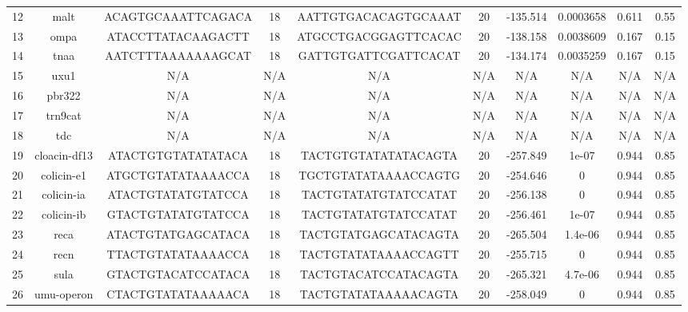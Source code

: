 \documentclass{article}
\begin{document}
\begin{table}
{\begin{tabular}{c|c|c|c|c|c|c|c|c|c}
 12 &          malt &  ACAGTGCAAATTCAGACA &    18 &  AATTGTGACACAGTGCAAAT &         20 &  -135.514 &  0.0003658 &    0.611 &   0.55 \\
 13 &          ompa &  ATACCTTATACAAGACTT &    18 &  ATGCCTGACGGAGTTCACAC &         20 &  -138.158 &  0.0038609 &    0.167 &   0.15 \\
 14 &          tnaa &  AATCTTTAAAAAAAGCAT &    18 &  GATTGTGATTCGATTCACAT &         20 &  -134.174 &  0.0035259 &    0.167 &   0.15 \\
 15 &          uxu1 &                 N/A &   N/A &                   N/A &        N/A &       N/A &        N/A &      N/A &    N/A \\
 16 &        pbr322 &                 N/A &   N/A &                   N/A &        N/A &       N/A &        N/A &      N/A &    N/A \\
 17 &       trn9cat &                 N/A &   N/A &                   N/A &        N/A &       N/A &        N/A &      N/A &    N/A \\
 18 &           tdc &                 N/A &   N/A &                   N/A &        N/A &       N/A &        N/A &      N/A &    N/A \\
 19 &  cloacin-df13 &  ATACTGTGTATATATACA &    18 &  TACTGTGTATATATACAGTA &         20 &  -257.849 &      1e-07 &    0.944 &   0.85 \\
 20 &    colicin-e1 &  ATGCTGTATATAAAACCA &    18 &  TGCTGTATATAAAACCAGTG &         20 &  -254.646 &          0 &    0.944 &   0.85 \\
 21 &    colicin-ia &  ATACTGTATATGTATCCA &    18 &  TACTGTATATGTATCCATAT &         20 &  -256.138 &          0 &    0.944 &   0.85 \\
 22 &    colicin-ib &  GTACTGTATATGTATCCA &    18 &  TACTGTATATGTATCCATAT &         20 &  -256.461 &      1e-07 &    0.944 &   0.85 \\
 23 &          reca &  ATACTGTATGAGCATACA &    18 &  TACTGTATGAGCATACAGTA &         20 &  -265.504 &    1.4e-06 &    0.944 &   0.85 \\
 24 &          recn &  TTACTGTATATAAAACCA &    18 &  TACTGTATATAAAACCAGTT &         20 &  -255.715 &          0 &    0.944 &   0.85 \\
 25 &          sula &  GTACTGTACATCCATACA &    18 &  TACTGTACATCCATACAGTA &         20 &  -265.321 &    4.7e-06 &    0.944 &   0.85 \\
 26 &    umu-operon &  CTACTGTATATAAAAACA &    18 &  TACTGTATATAAAAACAGTA &         20 &  -258.049 &          0 &    0.944 &   0.85 \\

\end{tabular}}
\end{table}
\end{document}
